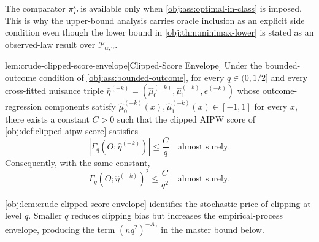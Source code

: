 The comparator \(\pi^\star_P\) is available only when \cref{obj:ass:optimal-in-class} is imposed.  This is why the upper-bound analysis carries oracle inclusion as an explicit side condition even though the lower bound in \cref{obj:thm:minimax-lower} is stated as an observed-law result over \(\mathcal P_{\alpha,\gamma}\).

\begin{lemmav}{lem:crude-clipped-score-envelope}[Clipped-Score Envelope]
Under the bounded-outcome condition of \cref{obj:ass:bounded-outcome}, for every \(q\in(0,1/2]\) and every cross-fitted nuisance triple \(\widehat\eta^{(-k)}=(\widehat\mu_0^{(-k)},\widehat\mu_1^{(-k)},\widehat e^{(-k)})\) whose outcome-regression components satisfy \(\widehat\mu_0^{(-k)}(x),\widehat\mu_1^{(-k)}(x)\in[-1,1]\) for every \(x\), there exists a constant \(C>0\) such that the clipped AIPW score of \cref{obj:def:clipped-aipw-score} satisfies
\[
\left|\Gamma_q\!\left(O;\widehat\eta^{(-k)}\right)\right|\le \frac{C}{q}
\quad\text{almost surely}.
\]
Consequently, with the same constant,
\[
\Gamma_q\!\left(O;\widehat\eta^{(-k)}\right)^2
\le \frac{C}{q^2}
\quad\text{almost surely}.
\]
\end{lemmav}

\cref{obj:lem:crude-clipped-score-envelope} identifies the stochastic price of clipping at level \(q\).  Smaller \(q\) reduces clipping bias but increases the empirical-process envelope, producing the term \((nq^2)^{-A_\alpha}\) in the master bound below.

